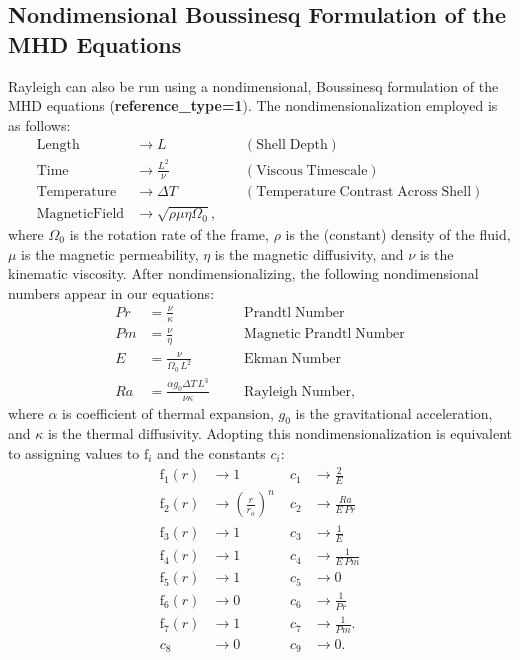 \documentclass[10pt,letterpaper]{article}
\newcommand{\ff}{\mathrm{f}}
\begin{document}
\subsection{Nondimensional Boussinesq Formulation of the MHD Equations}
Rayleigh can also be run using a nondimensional, Boussinesq formulation of the MHD equations (\textbf{reference\_type=1}).  The nondimensionalization employed is as follows: 
\begin{align*}
    \mathrm{Length} &\rightarrow L &\;\;\;\; \mathrm{(Shell\; Depth)} \\
    \mathrm{Time} &\rightarrow   \frac{L^2}{\nu} &\;\;\;\; \mathrm{(Viscous\; Timescale)}\\
    \mathrm{Temperature} &\rightarrow \Delta T&\;\;\;\; \mathrm{(Temperature\; Contrast\; Across\; Shell)} \\
    \mathrm{Magnetic Field} &\rightarrow \sqrt{\rho\mu\eta\Omega_0},
\end{align*}
where $\Omega_0$ is the rotation rate of the frame, $\rho$ is the (constant) density of the fluid, $\mu$ is the magnetic permeability, $\eta$ is the magnetic diffusivity, and $\nu$ is the kinematic viscosity.  After nondimensionalizing, the following nondimensional numbers appear in our equations:
\begin{align*}
    Pr &=\frac{\nu}{\kappa}                          &\;\;\;\;\;\; \mathrm{Prandtl\; Number} \\
    Pm &=\frac{\nu}{\eta}                            &\;\;\;\;\;\; \mathrm{Magnetic\; Prandtl\; Number} \\
    E  &=\frac{\nu}{\Omega_0\,L^2}                   &\;\;\;\;\;\; \mathrm{Ekman\; Number} \\
    Ra &=\frac{\alpha g_0 \Delta T\,L^3}{\nu\kappa}  &\;\;\;\;\;\; \mathrm{Rayleigh\; Number},
\end{align*}
where $\alpha$ is coefficient of thermal expansion, $g_0$ is the gravitational acceleration, and $\kappa$ is the thermal diffusivity.  Adopting this nondimensionalization is equivalent to assigning values to $\ff_i$ and the constants $c_i$:
\begin{align*}
\ff_1(r) &\rightarrow 1\; &c_1 &\rightarrow \frac{2}{E} \\
\ff_2(r) &\rightarrow \left(\frac{r}{r_o}\right)^n \; &c_2 &\rightarrow \frac{Ra}{E\,Pr} \\
\ff_3(r) &\rightarrow 1\; &c_3 &\rightarrow \frac{1}{E}\\
\ff_4(r) &\rightarrow 1\; &c_4 &\rightarrow \frac{1}{E\,Pm} \\
\ff_5(r) &\rightarrow 1\; &c_5 &\rightarrow 0 \\
\ff_6(r) &\rightarrow 0\; &c_6 &\rightarrow \frac{1}{Pr}  \\
\ff_7(r) &\rightarrow 1\; &c_7 &\rightarrow \frac{1}{Pm}. \\
c_8&\rightarrow 0 &c_9 &\rightarrow 0.
\end{align*}
\end{document}
